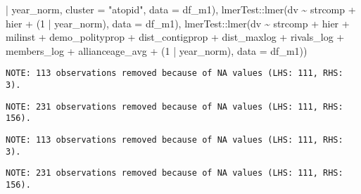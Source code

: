 \documentclass[
  12,
  letterpaper,
  DIV=11,
  numbers=noendperiod]{scrartcl}
\newenvironment{Shaded}{\begin{snugshade}}{\end{snugshade}}
\newcommand{\AttributeTok}[1]{\textcolor[rgb]{0.40,0.45,0.13}{#1}}
\newcommand{\DecValTok}[1]{\textcolor[rgb]{0.68,0.00,0.00}{#1}}
\newcommand{\FunctionTok}[1]{\textcolor[rgb]{0.28,0.35,0.67}{#1}}
\newcommand{\NormalTok}[1]{\textcolor[rgb]{0.00,0.23,0.31}{#1}}
\newcommand{\SpecialCharTok}[1]{\textcolor[rgb]{0.37,0.37,0.37}{#1}}
\newcommand{\StringTok}[1]{\textcolor[rgb]{0.13,0.47,0.30}{#1}}
\begin{document}
\begin{Shaded}
\begin{Highlighting}[numbers=left,,]
                             \SpecialCharTok{|}\NormalTok{ year\_norm, }
                             \AttributeTok{cluster =} \StringTok{"atopid"}\NormalTok{, }
                             \AttributeTok{data =}\NormalTok{ df\_m1),}
\NormalTok{               lmerTest}\SpecialCharTok{::}\FunctionTok{lmer}\NormalTok{(dv }\SpecialCharTok{\textasciitilde{}}\NormalTok{ strcomp }\SpecialCharTok{+}\NormalTok{ hier }\SpecialCharTok{+}
\NormalTok{                                (}\DecValTok{1} \SpecialCharTok{|}\NormalTok{ year\_norm),}
                              \AttributeTok{data =}\NormalTok{ df\_m1),}
\NormalTok{               lmerTest}\SpecialCharTok{::}\FunctionTok{lmer}\NormalTok{(dv }\SpecialCharTok{\textasciitilde{}}\NormalTok{ strcomp }\SpecialCharTok{+}\NormalTok{ hier }\SpecialCharTok{+}\NormalTok{ milinst }\SpecialCharTok{+}\NormalTok{ demo\_polityprop }\SpecialCharTok{+}\NormalTok{ dist\_contigprop }\SpecialCharTok{+}\NormalTok{ dist\_maxlog }\SpecialCharTok{+}\NormalTok{ rivals\_log }\SpecialCharTok{+}\NormalTok{ members\_log }\SpecialCharTok{+}\NormalTok{ allianceage\_avg }\SpecialCharTok{+}
\NormalTok{                                (}\DecValTok{1} \SpecialCharTok{|}\NormalTok{ year\_norm),}
                              \AttributeTok{data =}\NormalTok{ df\_m1))}
\end{Highlighting}
\end{Shaded}

\begin{verbatim}
NOTE: 113 observations removed because of NA values (LHS: 111, RHS: 3).
\end{verbatim}

\begin{verbatim}
NOTE: 231 observations removed because of NA values (LHS: 111, RHS: 156).
\end{verbatim}

\begin{verbatim}
NOTE: 113 observations removed because of NA values (LHS: 111, RHS: 3).
\end{verbatim}

\begin{verbatim}
NOTE: 231 observations removed because of NA values (LHS: 111, RHS: 156).
\end{verbatim}
\end{document}
